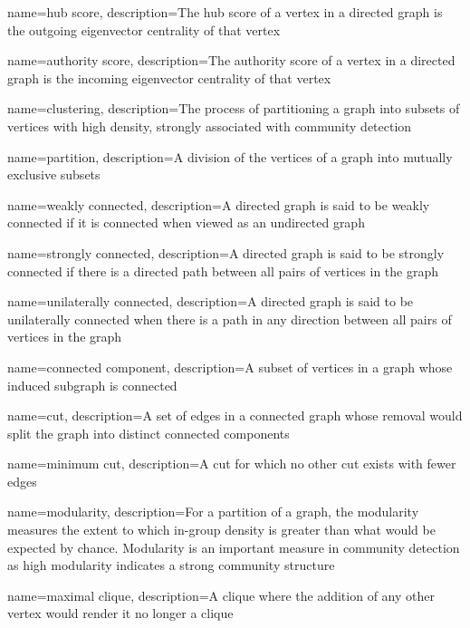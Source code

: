 {
    name={hub score},
    description={The hub score of a vertex in a directed graph is the outgoing eigenvector centrality of that vertex}
}

{
    name={authority score},
    description={The authority score of a vertex in a directed graph is the incoming eigenvector centrality of that vertex}
}

{
    name={clustering},
    description={The process of partitioning a graph into subsets of vertices with high density, strongly associated with community detection}
}

{
    name={partition},
    description={A division of the vertices of a graph into mutually exclusive subsets}
}

{
    name={weakly connected},
    description={A directed graph is said to be weakly connected if it is connected when viewed as an undirected graph}
}

{
    name={strongly connected},
    description={A directed graph is said to be strongly connected if there is a directed path between all pairs of vertices in the graph}
}

{
    name={unilaterally connected},
    description={A directed graph is said to be unilaterally connected when there is a path in any direction between all pairs of vertices in the graph}
}

{
    name={connected component},
    description={A subset of vertices in a graph whose induced subgraph is connected}
}

{
    name={cut},
    description={A set of edges in a connected graph whose removal would split the graph into distinct connected components}
}

{
    name={minimum cut},
    description={A cut for which no other cut exists with fewer edges}
}

{
    name={modularity},
    description={For a partition of a graph, the modularity measures the extent to which in-group density is greater than what would be expected by chance.  Modularity is an important measure in community detection as high modularity indicates a strong community structure}
}

{
    name={maximal clique},
    description={A clique where the addition of any other vertex would render it no longer a clique}
}

